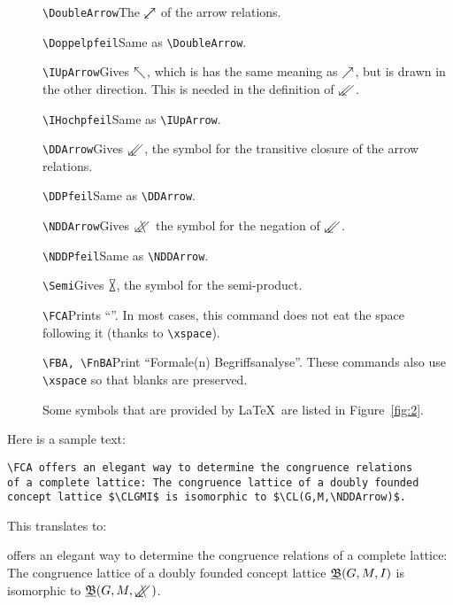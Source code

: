 \documentclass[12pt]{article}
\begin{document}
\begin{description}
\item[]\verb|\DoubleArrow|\quad  The $\Doppelpfeil$ of the arrow relations.
\item[]\verb|\Doppelpfeil|\quad   Same as \verb|\DoubleArrow|.
\item[]\verb|\IUpArrow|\quad  Gives $\mathrel{\nwarrow}$, which is has the same
  meaning as $\mathrel{\nearrow}$,  but is drawn in the other direction. This is needed
  in the  definition of $\DPfeil$.
\item[]\verb|\IHochpfeil|\quad  Same as \verb|\IUpArrow|.
\item[]\verb|\DDArrow|\quad Gives $\DDPfeil$, the symbol for the transitive
  closure of the arrow relations.  
\item[]\verb|\DDPfeil|\quad  Same as \verb|\DDArrow|.
\item[]\verb|\NDDArrow|\quad Gives $\NDDPfeil$ the symbol for the negation of
  $\DDPfeil$.   
\item[]\verb|\NDDPfeil|\quad  Same as \verb|\NDDArrow|.
\item[]\verb|\Semi|\quad Gives $\Semi$, the symbol for the semi-product.  
\item[]\verb|\FCA|\quad Prints ``\FCA''.  In most cases, this command does not
  eat the space following it (thanks to \verb|\xspace|).  
\item[]\verb|\FBA, \FnBA|\quad Print ``Formale(n) Begriffsanalyse''. These
  commands also use \verb|\xspace| so that blanks are preserved.
\item[]Some symbols that are provided by \LaTeX\ are listed in
  Figure~\ref{fig:2}. 
\end{description}
%
\par\noindent
Here is a sample text:
\begin{verbatim}
\FCA offers an elegant way to determine the congruence relations 
of a complete lattice: The congruence lattice of a doubly founded 
concept lattice $\CLGMI$ is isomorphic to $\CL(G,M,\NDDArrow)$.
\end{verbatim}
This translates to:
\begin{center}
  \begin{minipage}{.87\textwidth}
  \FCA offers an elegant way to determine the congruence relations of a
  complete lattice: The congruence lattice of a doubly founded concept lattice
  $\underline{{\mathfrak B}} (G,M,\mathrel{I})$ is   isomorphic to $\CL(G,M,\NDDArrow)$.
  \end{minipage}
\end{center}
%
%
\end{document}

